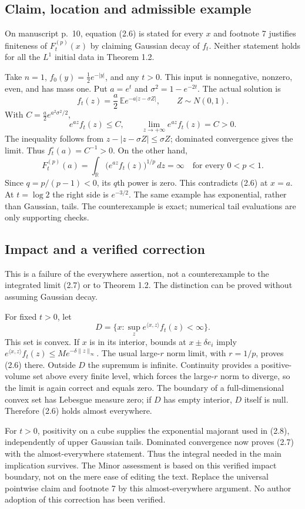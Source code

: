 \documentclass[10pt]{article}
\begin{document}
\subsection*{Claim, location and admissible example}
On manuscript p. 10, equation (2.6) is stated for every \(x\) and footnote 7 justifies finiteness of \(F_t^{(p)}(x)\) by claiming Gaussian decay of \(f_t\). Neither statement holds for all the \(L^1\) initial data in Theorem 1.2.\par
Take \(n=1\), \(f_0(y)=\tfrac12e^{-|y|}\), and any \(t>0\). This input is nonnegative, nonzero, even, and has mass one. Put \(a=e^t\) and \(\sigma^2=1-e^{-2t}\). The actual solution is \[f_t(z)=\frac a2\,\mathbb E e^{-a|z-\sigma Z|},\qquad Z\sim N(0,1).\] With \(C=\tfrac a2e^{a^2\sigma^2/2}\), \[e^{az}f_t(z)\leq C,\qquad
 \lim_{z\to+\infty}e^{az}f_t(z)=C>0 .\] The inequality follows from \(z-|z-\sigma Z|\leq\sigma Z\); dominated convergence gives the limit. Thus \(f_t^\circ(a)=C^{-1}>0\). On the other hand, \[F_t^{(p)}(a)=\int_{\mathbb R}
                  \big(e^{az}f_t(z)\big)^{1/p}\,dz=\infty
       \quad\text{for every }0<p<1.\] Since \(q=p/(p-1)<0\), its \(q\)th power is zero. This contradicts (2.6) at \(x=a\). At \(t=\log2\) the right side is \(e^{-3/2}\). The same example has exponential, rather than Gaussian, tails. The counterexample is exact; numerical tail evaluations are only supporting checks.\par
\subsection*{Impact and a verified correction}
This is a failure of the everywhere assertion, not a counterexample to the integrated limit (2.7) or to Theorem 1.2. The distinction can be proved without assuming Gaussian decay.\par
For fixed \(t>0\), let \[D=\{x:\sup_z e^{\langle x,z\rangle}f_t(z)<\infty\}.\] This set is convex. If \(x\) is in its interior, bounds at \(x\pm\delta e_i\) imply \(e^{\langle x,z\rangle}f_t(z)\leq M e^{-\delta\|z\|_\infty}\). The usual large-\(r\) norm limit, with \(r=1/p\), proves (2.6) there. Outside \(D\) the supremum is infinite. Continuity provides a positive-volume set above every finite level, which forces the large-\(r\) norm to diverge, so the limit is again correct and equals zero. The boundary of a full-dimensional convex set has Lebesgue measure zero; if \(D\) has empty interior, \(D\) itself is null. Therefore (2.6) holds almost everywhere.\par
For \(t>0\), positivity on a cube supplies the exponential majorant used in (2.8), independently of upper Gaussian tails. Dominated convergence now proves (2.7) with the almost-everywhere statement. Thus the integral needed in the main implication survives. The Minor assessment is based on this verified impact boundary, not on the mere ease of editing the text. Replace the universal pointwise claim and footnote 7 by this almost-everywhere argument. No author adoption of this correction has been verified.\par
\end{document}
